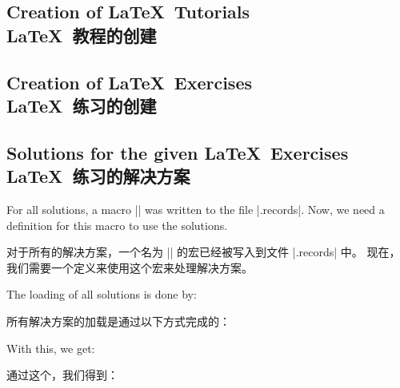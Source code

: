 \subsection{Creation of \LaTeX\ Tutorials\\\LaTeX\ 教程的创建}\label{sec:latextutorial}

\subsection{Creation of \LaTeX\ Exercises\\\LaTeX\ 练习的创建}\label{listing:exercises}


\subsection{Solutions for the given \LaTeX\ Exercises\\\LaTeX\ 练习的解决方案}

For all solutions, a macro |\processsol| was written to the file |\jobname.records|.
Now, we need a definition for this macro to use the solutions.

对于所有的解决方案，一个名为 |\processsol| 的宏已经被写入到文件 |\jobname.records| 中。 现在，我们需要一个定义来使用这个宏来处理解决方案。
\tcbusetemp

The loading of all solutions is done by:

所有解决方案的加载是通过以下方式完成的：

\begin{dispListing}
\tcbinputrecords
\end{dispListing}

With this, we get:

通过这个，我们得到：

\tcbusetemp



